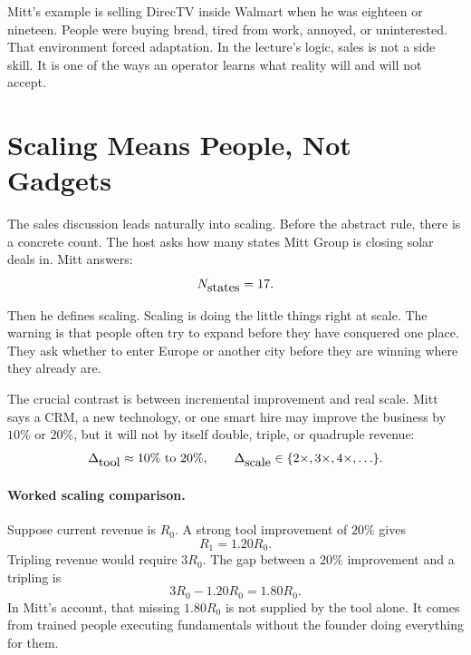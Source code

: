 Mitt's example is selling DirecTV inside Walmart when he was eighteen or nineteen. People were buying bread, tired from work, annoyed, or uninterested. That environment forced adaptation. In the lecture's logic, sales is not a side skill. It is one of the ways an operator learns what reality will and will not accept.

\section{Scaling Means People, Not Gadgets}

The sales discussion leads naturally into scaling. Before the abstract rule, there is a concrete count. The host asks how many states Mitt Group is closing solar deals in. Mitt answers:
\begin{equation}
  N_{\hbox{states}}=17.
\end{equation}

Then he defines scaling. Scaling is doing the little things right at scale. The warning is that people often try to expand before they have conquered one place. They ask whether to enter Europe or another city before they are winning where they already are.

The crucial contrast is between incremental improvement and real scale. Mitt says a CRM, a new technology, or one smart hire may improve the business by \(10\%\) or \(20\%\), but it will not by itself double, triple, or quadruple revenue:
\begin{equation}
  \Delta_{\hbox{tool}}
  \approx 10\%\hbox{ to }20\%,
  \qquad
  \Delta_{\hbox{scale}}
  \in
  \{2\times,3\times,4\times,\ldots\}.
\end{equation}

\paragraph{Worked scaling comparison.}
Suppose current revenue is \(R_0\). A strong tool improvement of \(20\%\) gives
\begin{equation}
  R_1=1.20R_0.
\end{equation}
Tripling revenue would require \(3R_0\). The gap between a \(20\%\) improvement and a tripling is
\begin{equation}
  3R_0-1.20R_0=1.80R_0.
\end{equation}
In Mitt's account, that missing \(1.80R_0\) is not supplied by the tool alone. It comes from trained people executing fundamentals without the founder doing everything for them.

